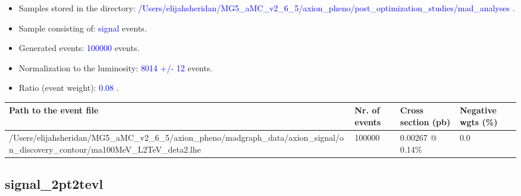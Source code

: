 \documentclass[a4paper, 10pt]{article}
\begin{document}
\begin{itemize}
  \item Samples stored in the directory: \textcolor{blue}{/\-Users/\-elijahsheridan/\-MG5\_aMC\_v2\_6\_5/\-axion\_pheno/\-post\_optimization\_studies/\-mad\_analyses} .
   \item Sample consisting of: \textcolor{blue}{signal}  events.
   \item Generated events: \textcolor{blue}{100000 }  events.
   \item Normalization to the luminosity: \textcolor{blue}{8014}\textcolor{blue}{ +/\-- }\textcolor{blue}{12 }  events.
   \item Ratio (event weight): \textcolor{blue}{0.08 } .  
 
\end{itemize}
\begin{table}[H]
  \begin{center}
    \begin{tabular}{|m{55.0mm}|m{25.0mm}|m{30.0mm}|m{30.0mm}|}
      \hline
      {\cellcolor{yellow}         Path to the event file}& {\cellcolor{yellow}         Nr. of events}& {\cellcolor{yellow}         Cross section (pb)}& {\cellcolor{yellow}         Negative wgts (\%)}\\
      \hline
      {\cellcolor{white}          /\-Users/\-elijahsheridan/\-MG5\_aMC\_v2\_6\_5/\-axion\_pheno/\-madgraph\_data/\-axion\_signal/\-on\_discovery\_contour/\-ma100MeV\_L2TeV\_deta2.lhe}& {\cellcolor{white}          100000}& {\cellcolor{white}          0.00267 @ 0.14\%}& {\cellcolor{white}          0.0}\\
\hline
    \end{tabular}
  \end{center}
\end{table}

\subsection{ signal\_2pt2tevl}
\end{document}
